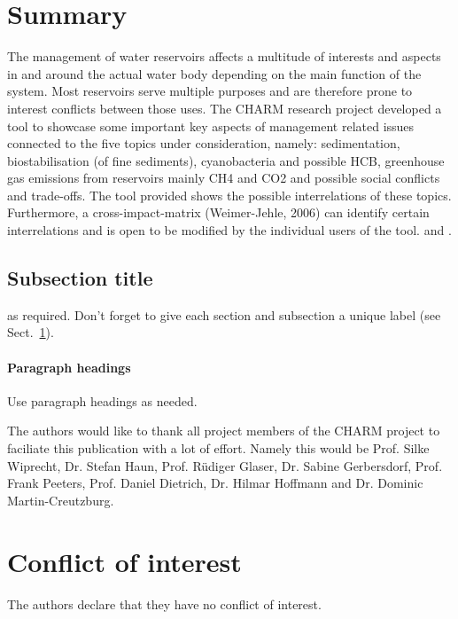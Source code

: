 \section{Summary}
\label{sec:1}
The management of water reservoirs affects a multitude of interests and aspects in and around the actual water body depending on the main function of the system. Most reservoirs serve multiple purposes and are therefore prone to interest conflicts between those uses. The CHARM research project developed a tool to showcase some important key aspects of management related issues connected to the five topics under consideration, namely: sedimentation, biostabilisation (of fine sediments), cyanobacteria and possible HCB, greenhouse gas emissions from reservoirs mainly CH4 and CO2 and possible social conflicts and trade-offs. The tool provided shows the possible  interrelations of these topics. Furthermore, a cross-impact-matrix (Weimer-Jehle, 2006) can identify certain interrelations and is open to be modified by the individual users of the tool.
 \cite{RefB} and \cite{RefJ}.
\subsection{Subsection title}
\label{sec:2}
as required. Don't forget to give each section
and subsection a unique label (see Sect.~\ref{sec:1}).
\paragraph{Paragraph headings} Use paragraph headings as needed.


\begin{acknowledgements}
The authors would like to thank all project members of the CHARM project to faciliate this publication with a lot of effort. Namely this would be Prof. Silke Wiprecht, Dr. Stefan Haun, Prof. Rüdiger Glaser, Dr. Sabine Gerbersdorf, Prof. Frank Peeters, Prof. Daniel Dietrich, Dr. Hilmar Hoffmann and Dr. Dominic Martin-Creutzburg.
\end{acknowledgements}

\section*{Conflict of interest}
The authors declare that they have no conflict of interest.


